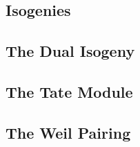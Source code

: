 \subsection{Isogenies}

\subsection{The Dual Isogeny}

\subsection{The Tate Module}

\subsection{The Weil Pairing}
